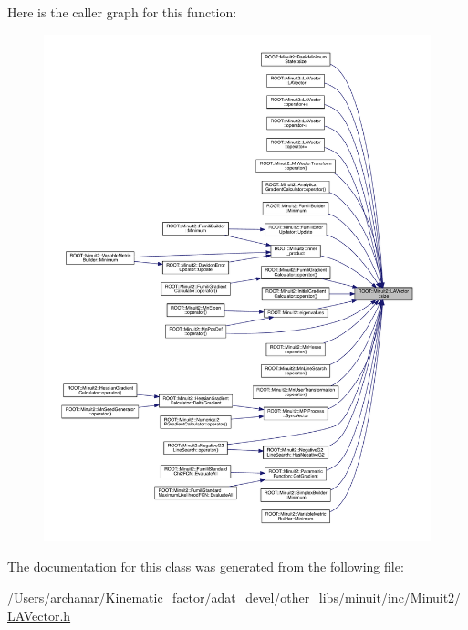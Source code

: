 Here is the caller graph for this function\+:\nopagebreak
\begin{figure}[H]
\begin{center}
\leavevmode
\includegraphics[width=350pt]{d3/d20/classROOT_1_1Minuit2_1_1LAVector_a145e47ac78c4fcace3209ef477255937_icgraph}
\end{center}
\end{figure}


The documentation for this class was generated from the following file\+:\begin{DoxyCompactItemize}
\item 
/\+Users/archanar/\+Kinematic\+\_\+factor/adat\+\_\+devel/other\+\_\+libs/minuit/inc/\+Minuit2/\mbox{\hyperlink{other__libs_2minuit_2inc_2Minuit2_2LAVector_8h}{L\+A\+Vector.\+h}}\end{DoxyCompactItemize}
